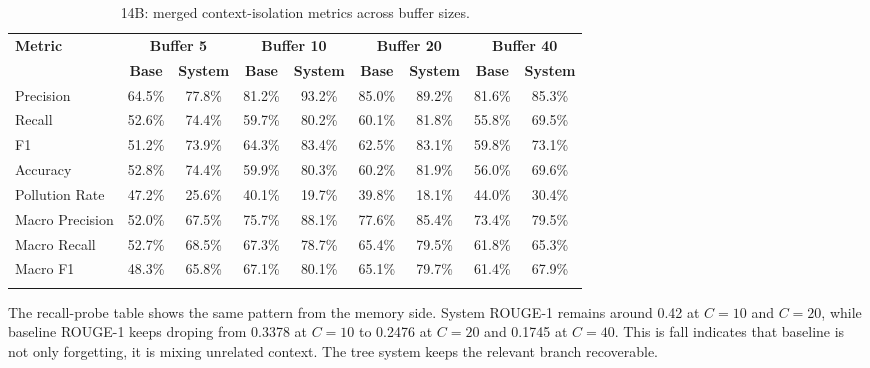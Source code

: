 \documentclass[pdflatex,sn-mathphys-num]{sn-jnl}%
\theoremstyle{thmstyleone}%
\theoremstyle{thmstyletwo}%
\theoremstyle{thmstylethree}%
\begin{document}
\begin{table}[htbp]
\caption{14B: merged context-isolation metrics across buffer sizes.}\label{tab:14b_context_main}
\centering
\scriptsize
\setlength{\tabcolsep}{3pt}
\begin{adjustbox}{width=\textwidth}
\begin{tabular}{lcccccccc}
\toprule
\textbf{Metric} & \multicolumn{2}{c}{\textbf{Buffer 5}} & \multicolumn{2}{c}{\textbf{Buffer 10}} & \multicolumn{2}{c}{\textbf{Buffer 20}} & \multicolumn{2}{c}{\textbf{Buffer 40}} \\
\cmidrule(lr){2-3}\cmidrule(lr){4-5}\cmidrule(lr){6-7}\cmidrule(lr){8-9}
 & \textbf{Base} & \textbf{System} & \textbf{Base} & \textbf{System} & \textbf{Base} & \textbf{System} & \textbf{Base} & \textbf{System} \\
\midrule
Precision & 64.5\% & 77.8\% & 81.2\% & 93.2\% & 85.0\% & 89.2\% & 81.6\% & 85.3\% \\
Recall & 52.6\% & 74.4\% & 59.7\% & 80.2\% & 60.1\% & 81.8\% & 55.8\% & 69.5\% \\
F1 & 51.2\% & 73.9\% & 64.3\% & 83.4\% & 62.5\% & 83.1\% & 59.8\% & 73.1\% \\
Accuracy & 52.8\% & 74.4\% & 59.9\% & 80.3\% & 60.2\% & 81.9\% & 56.0\% & 69.6\% \\
Pollution Rate & 47.2\% & 25.6\% & 40.1\% & 19.7\% & 39.8\% & 18.1\% & 44.0\% & 30.4\% \\
Macro Precision & 52.0\% & 67.5\% & 75.7\% & 88.1\% & 77.6\% & 85.4\% & 73.4\% & 79.5\% \\
Macro Recall & 52.7\% & 68.5\% & 67.3\% & 78.7\% & 65.4\% & 79.5\% & 61.8\% & 65.3\% \\
Macro F1 & 48.3\% & 65.8\% & 67.1\% & 80.1\% & 65.1\% & 79.7\% & 61.4\% & 67.9\% \\
\botrule
\end{tabular}
\end{adjustbox}
\end{table}

The recall-probe table shows the same pattern from the memory side. System ROUGE-1 remains around 0.42 at $C=10$ and $C=20$, while baseline ROUGE-1 keeps droping from 0.3378 at $C=10$ to 0.2476 at $C=20$ and 0.1745 at $C=40$. This is fall indicates that baseline is not only forgetting, it is mixing unrelated context. The tree system keeps the relevant branch recoverable.
\end{document}
